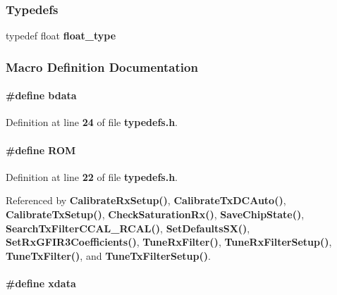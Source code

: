\subsubsection*{Typedefs}
\begin{DoxyCompactItemize}
\item 
typedef float {\bf float\+\_\+type}
\end{DoxyCompactItemize}


\subsubsection{Macro Definition Documentation}
\paragraph[{bdata}]{\setlength{\rightskip}{0pt plus 5cm}\#define bdata}\label{typedefs_8h_a4c97264453f16cbc633de35be518e550}


Definition at line {\bf 24} of file {\bf typedefs.\+h}.

\paragraph[{R\+OM}]{\setlength{\rightskip}{0pt plus 5cm}\#define R\+OM}\label{typedefs_8h_a408c4c066164afa1b6aa3f804c3d3528}


Definition at line {\bf 22} of file {\bf typedefs.\+h}.



Referenced by {\bf Calibrate\+Rx\+Setup()}, {\bf Calibrate\+Tx\+D\+C\+Auto()}, {\bf Calibrate\+Tx\+Setup()}, {\bf Check\+Saturation\+Rx()}, {\bf Save\+Chip\+State()}, {\bf Search\+Tx\+Filter\+C\+C\+A\+L\+\_\+\+R\+C\+A\+L()}, {\bf Set\+Defaults\+S\+X()}, {\bf Set\+Rx\+G\+F\+I\+R3\+Coefficients()}, {\bf Tune\+Rx\+Filter()}, {\bf Tune\+Rx\+Filter\+Setup()}, {\bf Tune\+Tx\+Filter()}, and {\bf Tune\+Tx\+Filter\+Setup()}.

\paragraph[{xdata}]{\setlength{\rightskip}{0pt plus 5cm}\#define xdata}\label{typedefs_8h_aabfd90ba34ac2d5def2c526994321e5a}


